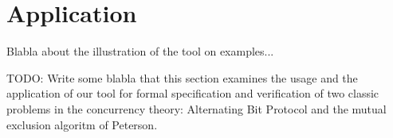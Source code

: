 \section{Application}

Blabla about the illustration of the tool on examples...

TODO: Write some blabla that this section examines the usage and the application of our tool for formal specification and verification of two classic problems in the concurrency theory: Alternating Bit Protocol and the mutual exclusion algoritm of Peterson.


